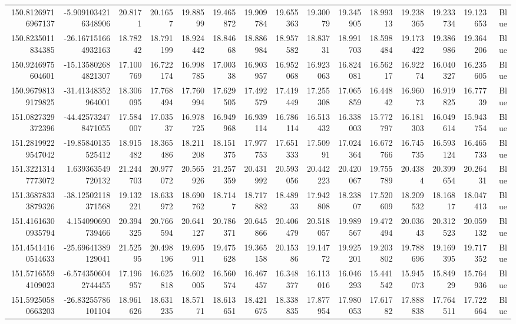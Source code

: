 \begin{center}
\begin{longtable}{rrrrrrrrrrrrrrr}
150.81269716967137 & -5.9091034216348906 & 20.8171 & 20.1657 & 19.88599 & 19.465872 & 19.909784 & 19.655363 & 19.30079 & 19.345905 & 18.99313 & 19.238365 & 19.233734 & 19.123653 & Blue \\
150.8235011834385 & -26.167151664932163 & 18.78242 & 18.791199 & 18.924442 & 18.84668 & 18.886984 & 18.957582 & 18.83731 & 18.991703 & 18.598484 & 19.173422 & 19.386986 & 19.364206 & Blue \\
150.9246975604601 & -15.135802684821307 & 17.100769 & 16.722174 & 16.998785 & 17.00338 & 16.903957 & 16.952068 & 16.923063 & 16.824081 & 16.56217 & 16.92274 & 16.040327 & 16.235605 & Blue \\
150.96798139179825 & -31.41348352964001 & 18.306095 & 17.768494 & 17.760994 & 17.629505 & 17.492579 & 17.419449 & 17.255308 & 17.065859 & 16.44842 & 16.96073 & 16.919825 & 16.77739 & Blue \\
151.0827329372396 & -44.425732478471055 & 17.584007 & 17.03537 & 16.978725 & 16.949968 & 16.939114 & 16.786114 & 16.513432 & 16.338003 & 15.772797 & 16.181303 & 16.049614 & 15.943754 & Blue \\
151.28199229547042 & -19.85840135525412 & 18.915482 & 18.365486 & 18.211208 & 18.151375 & 17.977753 & 17.651333 & 17.50991 & 17.024364 & 16.672766 & 16.745735 & 16.593124 & 16.465733 & Blue \\
151.32213147773072 & 1.639363549720132 & 21.244703 & 20.977072 & 20.565926 & 21.257359 & 20.431992 & 20.593056 & 20.442223 & 20.420067 & 19.755789 & 20.4384 & 20.399654 & 20.26431 & Blue \\
151.36878333879326 & -38.12502118371568 & 19.132221 & 18.633972 & 18.690762 & 18.7147 & 18.717882 & 18.48933 & 17.942808 & 18.23807 & 17.520609 & 18.209532 & 18.16817 & 18.047413 & Blue \\
151.41616300935794 & 4.154090690739466 & 20.394325 & 20.766594 & 20.641127 & 20.786371 & 20.645866 & 20.406479 & 20.518057 & 19.989567 & 19.472494 & 20.03643 & 20.312523 & 20.059132 & Blue \\
151.45414160514633 & -25.69641389129041 & 21.52595 & 20.498196 & 19.695911 & 19.475628 & 19.365158 & 20.15386 & 19.14772 & 19.925201 & 19.203802 & 19.788696 & 19.169395 & 19.717352 & Blue \\
151.57165594109023 & -6.5743506042744455 & 17.196957 & 16.625818 & 16.602005 & 16.560574 & 16.467457 & 16.348377 & 16.113016 & 16.046293 & 15.441542 & 15.945073 & 15.84929 & 15.764936 & Blue \\
151.59250580663203 & -26.83255786101104 & 18.961626 & 18.631235 & 18.57171 & 18.613651 & 18.421675 & 18.338835 & 17.877954 & 17.980053 & 17.61782 & 17.888838 & 17.764511 & 17.722664 & Blue \\

\end{longtable}
\end{center}
